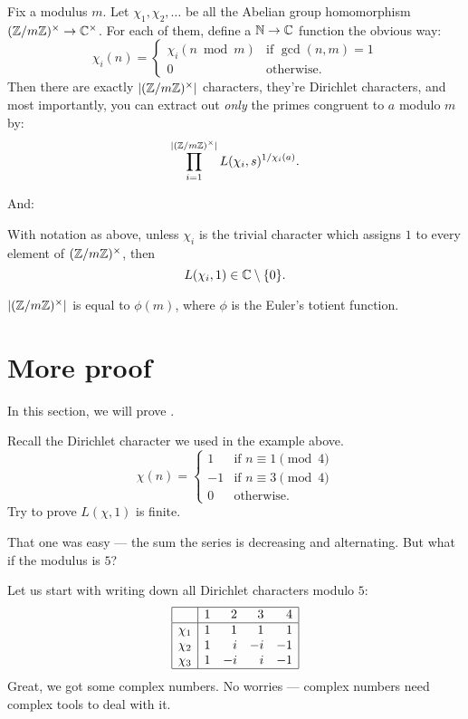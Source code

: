 \begin{theorem}
	Fix a modulus $m$.
	Let $\chi_1, \chi_2, \dots$ be all the Abelian group homomorphism
	$(\mathbb Z/m\mathbb Z)^\times \to \mathbb C^{\times}$.
	For each of them, define a $\mathbb N \to \mathbb C$ function the obvious way:
	\[ \chi_i(n) = \begin{cases}
		\chi_i(n \bmod m)&\text{if }\gcd(n, m) = 1 \\
		0&\text{otherwise.}
	\end{cases} \]
	Then there are exactly $|(\mathbb Z/m\mathbb Z)^\times|$ characters, they're Dirichlet characters,
	and most importantly, you can extract out \emph{only} the primes congruent to $a$ modulo $m$ by:
	\[
		\prod_{i=1}^{|(\mathbb Z/m\mathbb Z)^\times|} L(\chi_i, s)^{1/\chi_i(a)}.
	\]
\end{theorem}

And:
\begin{proposition} %
	\label{prop:l1_finite_nonzero}
	With notation as above, unless $\chi_i$ is the trivial character which assigns $1$ to every
	element of $(\mathbb Z/m\mathbb Z)^\times$, then
	\[ L(\chi_i, 1) \in \mathbb C \setminus \{0\}. \]
\end{proposition}

\begin{remark}[Anecdote]
	$|(\mathbb Z/m\mathbb Z)^\times|$ is equal to $\phi(m)$, where $\phi$ is the Euler's totient function.
\end{remark}

\section{More proof}

In this section, we will prove .

\begin{exercise}
	Recall the Dirichlet character we used in the example above.
	\[ \chi(n) = \begin{cases}
		1 &\text{if }n \equiv 1 \pmod{4} \\
		-1&\text{if }n \equiv 3 \pmod{4} \\
		0 &\text{otherwise.}
	\end{cases} \]
	Try to prove $L(\chi, 1)$ is finite.
\end{exercise}

That one was easy --- the sum the series is decreasing and alternating.
But what if the modulus is $5$?

Let us start with writing down all Dirichlet characters modulo $5$:
\[
	\begin{array}{|r|rrrr|}
		\hline
		    & 1 & 2 & 3 & 4 \\ \hline
		\chi_1 & 1 & 1 & 1 & 1 \\
		\chi_2 & 1 & i & -i & -1 \\
		\chi_3 & 1 & -i & i & -1 \\ \hline
	\end{array}
\]
Great, we got some complex numbers.
No worries --- complex numbers need complex tools to deal with it.

